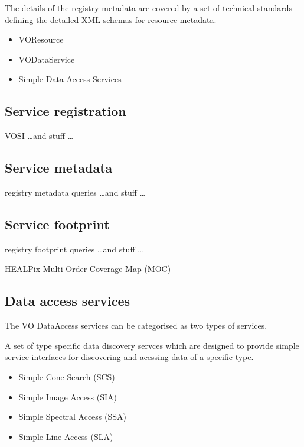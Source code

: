 \documentclass{article}
\begin{document}
The details of the registry metadata are covered by a set of technical
standards defining the detailed XML schemas for resource metadata.
\begin{itemize}
  \item VOResource
  \item VODataService
  \item Simple Data Access Services
\end{itemize}

\subsection{Service registration}

VOSI \ldots and stuff \ldots

\subsection{Service metadata}

registry metadata queries \ldots and stuff \ldots

\subsection{Service footprint}

registry footprint queries \ldots and stuff \ldots

HEALPix Multi-Order Coverage Map (MOC)

\subsection{Data access services}

The VO DataAccess services can be categorised as two types of services.

A set of type specific data discovery servces which are designed to provide
simple service interfaces for discovering and acessing data of a specific type.

\begin{itemize}
  \item Simple Cone Search (SCS)
  \item Simple Image Access (SIA)
  \item Simple Spectral Access (SSA)
  \item Simple Line Access (SLA)
\end{itemize}
\end{document}
